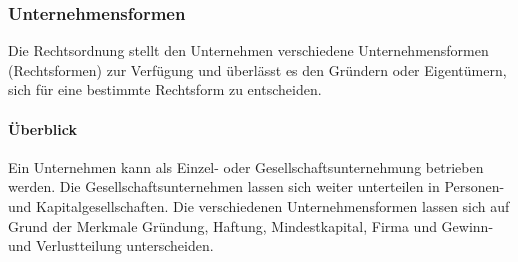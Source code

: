 	\subsubsection{Unternehmensformen}
	Die Rechtsordnung stellt den Unternehmen verschiedene Unternehmensformen (Rechtsformen) zur Verfügung und überlässt es den Gründern oder Eigentümern, sich für eine bestimmte Rechtsform zu entscheiden.
	
	\paragraph{Überblick}
	Ein Unternehmen kann als Einzel- oder Gesellschaftsunternehmung betrieben werden. Die Gesellschaftsunternehmen lassen sich weiter unterteilen in Personen- und Kapitalgesellschaften. Die verschiedenen Unternehmensformen lassen sich auf Grund der Merkmale Gründung, Haftung, Mindestkapital, Firma und Gewinn- und Verlustteilung unterscheiden.\\
	
